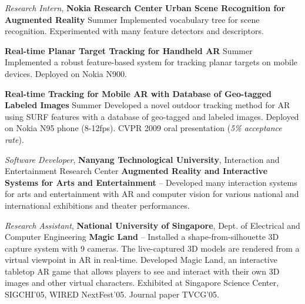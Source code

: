 \documentclass[letterpaper,MMMyyyy,nonstopmode]{simpleresumecv}
\begin{document}
\begin{Body}
\BigGap
\Entry
{\textit{Research Intern}, \textbf{Nokia Research Center}}
\Gap
\BulletItem
\textbf{Urban Scene Recognition for Augmented Reality}
\hfill
Summer 
\SubBulletItem
Implemented vocabulary tree for scene recognition. 
\SubBulletItem
Experimented with many feature detectors and descriptors.

\Gap
\BulletItem
\textbf{Real-time Planar Target Tracking for Handheld AR}
\hfill
Summer 
\SubBulletItem
Implemented a robust feature-based system for tracking planar targets on mobile devices. Deployed on Nokia N900.

\Gap
\BulletItem
\textbf{Real-time Tracking for Mobile AR with Database of Geo-tagged Labeled Images}
\hfill
Summer 
\SubBulletItem
Developed a novel outdoor tracking method for AR using SURF features with a database of geo-tagged and labeled images. Deployed on Nokia N95 phone (8-12fps). 
CVPR 2009 oral presentation (\textit{5\% acceptance rate}). 

\BigGap
\Entry
{\textit{Software Developer}, \textbf{Nanyang Technological University}, Interaction and Entertainment Research Center}
\Gap
\BulletItem
\textbf{Augmented Reality and Interactive Systems for Arts and Entertainment}
\hfill
{} -- 
\SubBulletItem
Developed many interaction systems for arts and entertainment with AR and computer vision for various national and international exhibitions and theater performances.

\BigGap
\Entry
{\textit{Research Assistant}, \textbf{ National University of Singapore}, Dept. of Electrical and Computer Engineering}
\Gap
\BulletItem
\textbf{Magic Land}
\hfill
{} -- 
\SubBulletItem
Installed a shape-from-silhouette 3D capture system with 9 cameras. The live-captured 3D models are rendered from a virtual viewpoint in AR in real-time. 
\SubBulletItem
Developed Magic Land, an interactive tabletop AR game that allows players to see and interact with their own 3D images and other virtual characters. 
\SubBulletItem
Exhibited at Singapore Science Center, SIGCHI’05, WIRED NextFest’05. Journal paper TVCG'05.



\end{Body}
\end{document}
